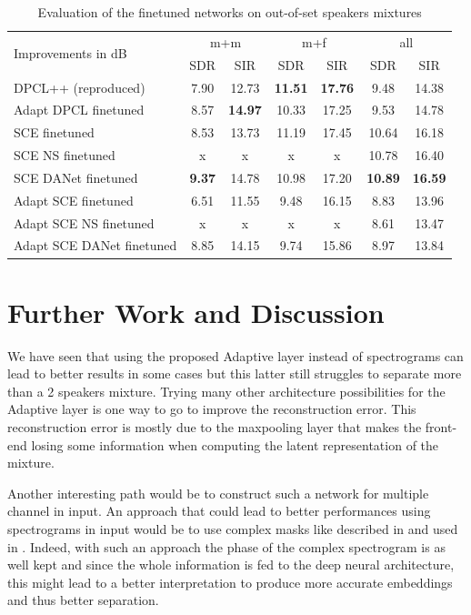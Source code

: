 \documentclass[master, tikz, final,11pt, dvipdfmx]{iscs-thesis}
\begin{document}
\begin{table}[h]
\centering
\begin{tabular}{l|c|c|c|c|c|c}
\multirow{2}{*}{Improvements in dB} & \multicolumn{2}{c|}{m+m} & \multicolumn{2}{c|}{m+f} & \multicolumn{2}{c}{all} \\ 
\cline{2-7} 
 & SDR & SIR & SDR & SIR & SDR & SIR \\ 
\hline 
DPCL++ (reproduced) & 7.90 & 12.73 & \cellcolor{green}\textbf{11.51} & \cellcolor{green}\textbf{17.76} & 9.48 & 14.38 \\ 
Adapt DPCL finetuned & 8.57 & \textbf{14.97} & 10.33 & 17.25 & 9.53 & 14.78 \\ 
\hline
\hline
SCE finetuned & 8.53 & 13.73 & 11.19 & 17.45 & 10.64 & 16.18 \\ 
SCE NS finetuned & x & x & x & x & 10.78 & 16.40 \\ 
SCE DANet finetuned & \cellcolor{green}\textbf{9.37} & \cellcolor{green}14.78 & 10.98 & 17.20 & \cellcolor{green}\textbf{10.89}& \cellcolor{green}\textbf{16.59} \\ 
Adapt SCE finetuned  & 6.51 & 11.55 & 9.48 & 16.15 & 8.83 & 13.96 \\ 
Adapt SCE NS finetuned& x & x & x & x & 8.61 & 13.47 \\ 
Adapt SCE DANet finetuned & 8.85 & 14.15 & 9.74 & 15.86 & 8.97 & 13.84 \\ 

\end{tabular}
\caption{Evaluation of the finetuned networks on out-of-set speakers mixtures}
\label{globalout}
\end{table}

\chapter{Further Work and Discussion}

We have seen that using the proposed Adaptive layer instead of spectrograms can lead to better results in some cases but this latter still struggles to separate more than a 2 speakers mixture. Trying many other architecture possibilities for the Adaptive layer is one way to go to improve the reconstruction error. This reconstruction error is mostly due to the maxpooling layer that makes the front-end losing some information when computing the latent representation of the mixture.

Another interesting path would be to construct such a network for multiple channel in input.
An approach that could lead to better performances using spectrograms in input would be to use complex masks like described in \cite{OverviewSSDL} and used in \cite{ImageSS}. Indeed, with such an approach the phase of the complex spectrogram is as well kept and since the whole information is fed to the deep neural architecture, this might lead to a better interpretation to produce more accurate embeddings and thus better separation.
\end{document}

